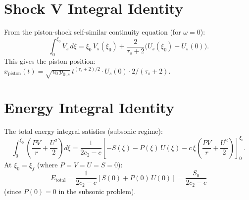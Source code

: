 \documentclass[11pt]{article}
\newcommand{\xsi}{\xi}
\newcommand{\xsif}{\xi_f}
\begin{document}
\section{Shock V Integral Identity}
\label{app:V_shock}

From the piston-shock self-similar continuity equation (for $\omega = 0$):
\begin{equation}
  \int_0^{\xsi_0} V_s\,d\xsi = \xsi_0\,V_s(\xsi_0) + \frac{2}{\tau_s+2}\bigl(U_s(\xsi_0) - U_s(0)\bigr).
\end{equation}
This gives the piston position: $x_{\mathrm{piston}}(t) = \sqrt{v_0\,p_{0,s}}\,t^{(\tau_s+2)/2}\cdot U_s(0)\cdot 2/(\tau_s+2)$.

\section{Energy Integral Identity}
\label{app:energy}

The total energy integral satisfies (subsonic regime):
\begin{equation}
  \int_0^{\xsi_0}\left(\frac{PV}{r} + \frac{U^2}{2}\right)d\xsi
  = \frac{1}{2c_2-c}\left[-S(\xsi) - P(\xsi)\,U(\xsi) - c\,\xsi\left(\frac{PV}{r}+\frac{U^2}{2}\right)\right]_0^{\xsi_0}.
\end{equation}
At $\xsi_0 = \xsif$ (where $P=V=U=S=0$):
\begin{equation}
  E_{\mathrm{total}} = \frac{1}{2c_2-c}\left[S(0) + P(0)\,U(0)\right] = \frac{S_0}{2c_2-c}
\end{equation}
(since $P(0) = 0$ in the subsonic problem).
\end{document}
